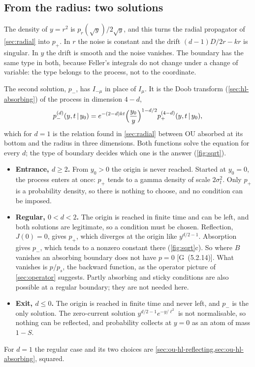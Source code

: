 \documentclass[11pt]{article}
\numberwithin{equation}{section}
\newcommand{\given}{\,|\,}
\newcommand{\G}[1]{[G~(#1)]}
\begin{document}
\subsection{From the radius: two solutions}

The density of $y=r^2$ is $p_r(\sqrt y)/2\sqrt y$, and this turns the radial propagator of \cref{sec:radial} into
$p_+$. In $r$ the noise is constant and the drift $(d-1)D/2r-kr$ is singular. In $y$ the drift is smooth and the
noise vanishes. The boundary has the same type in both, because Feller's integrals do not change under a change of
variable: the type belongs to the process, not to the coordinate.

The second solution, $p_-$, has $I_{-\mu}$ in place of $I_\mu$. It is the Doob transform (\cref{sec:hl-absorbing}) of
the process in dimension $4-d$,
\begin{equation}
  p_-^{(d)}(y,t\given y_0)=e^{-(2-d)kt}\Bigl(\frac{y_0}{y}\Bigr)^{1-d/2}p_+^{(4-d)}(y,t\given y_0),
\end{equation}
which for $d=1$ is the relation found in \cref{sec:radial} between OU absorbed at its bottom and the radius in three
dimensions. Both functions solve the equation for every $d$; the type of boundary decides which one is the answer
(\cref{fig:sqrt}).
\begin{itemize}
  \item \textbf{Entrance, $d\ge2$.} From $y_0>0$ the origin is never reached. Started at $y_0=0$, the process enters
        at once: $p_+$ tends to a gamma density of scale $2\sigma_t^2$. Only $p_+$ is a probability density, so there is
        nothing to choose, and no condition can be imposed.
  \item \textbf{Regular, $0<d<2$.} The origin is reached in finite time and can be left, and both solutions are
        legitimate, so a condition must be chosen. Reflection, $J(0)=0$, gives $p_+$, which diverges at the origin
        like $y^{d/2-1}$. Absorption gives $p_-$, which tends to a nonzero constant there (\cref{fig:sqrt}c). So where
        $B$ vanishes an absorbing boundary does not have $p=0$ \G{5.2.14}. What vanishes is $p/p_s$, the backward
        function, as the operator picture of \cref{sec:operator} suggests. Partly absorbing and sticky conditions are
        also possible at a regular boundary; they are not needed here.
  \item \textbf{Exit, $d\le0$.} The origin is reached in finite time and never left, and $p_-$ is the only
        solution. The zero-current solution $y^{d/2-1}e^{-y/\ell^2}$ is not normalisable, so nothing can be
        reflected, and probability collects at $y=0$ as an atom of mass $1-S$.
\end{itemize}
For $d=1$ the regular case and its two choices are \cref{sec:ou-hl-reflecting,sec:ou-hl-absorbing}, squared.
\end{document}
